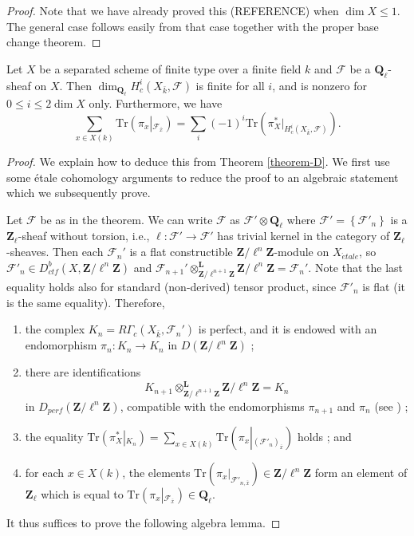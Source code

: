 \begin{proof}
Note that we have already proved this (REFERENCE) when $\dim X \leq 1$. The
general case follows easily from that case together with the proper base change
theorem.
\end{proof}

\begin{theorem}
\label{theorem-C}
Let $X$ be a separated scheme of finite type over a finite field $k$ and
$\mathcal{F}$ be a $\mathbf{Q}_\ell$-sheaf on $X$. Then
$\dim_{\mathbf{Q}_\ell}H_c^i(X_{\bar k}, \mathcal{F})$ is finite for all $i$,
and is nonzero for $0\leq i \leq 2 \dim X$ only. Furthermore, we have
$$
\sum_{x\in X(k)} \text{Tr}\left(\pi_x\left|_{\mathcal{F}_{\bar
x}}\right.\right) = \sum_i (-1)^i\text{Tr}\left(\pi_X^*\big|_{H_c^i(X_{\bar k},
\mathcal{F})}\right).
$$
\end{theorem}

\begin{proof}
We explain how to deduce this from Theorem \ref{theorem-D}.
We first use some \'etale cohomology arguments to reduce the proof
to an algebraic statement which we subsequently prove.

\medskip\noindent
Let $\mathcal{F}$ be as in the theorem. We can write
$\mathcal{F}$ as
$\mathcal{F}'\otimes \mathbf{Q}_\ell$ where $\mathcal{F}' =
\left\{\mathcal{F}'_n\right\}$ is a $\mathbf{Z}_\ell$-sheaf without torsion,
i.e., $\ell : \mathcal{F}'\to \mathcal{F}'$ has trivial kernel in the
category of $\mathbf{Z}_\ell$-sheaves. Then each $\mathcal{F}_n'$ is a flat
constructible $\mathbf{Z}/\ell^n\mathbf{Z}$-module on $X_{\acute{e}tale}$, so
$\mathcal{F}'_n \in D_{ctf}^b(X, \mathbf{Z}/\ell^n\mathbf{Z})$ and
$\mathcal{F}_{n+1}'
\otimes^{\mathbf{L}}_{\mathbf{Z}/\ell^{n+1}\mathbf{Z}}
\mathbf{Z}/\ell^n\mathbf{Z} = \mathcal{F}_n'$.
Note that the last equality holds also
for standard (non-derived) tensor product, since $\mathcal{F}'_n$ is flat
(it is the same equality). Therefore,
\begin{enumerate}
\item
the complex $K_n= R\Gamma_c\left(X_{\bar k}, \mathcal{F}_n'\right)$ is perfect,
and it is endowed with an endomorphism $\pi_n: K_n\to K_n$ in
$D(\mathbf{Z}/\ell^n\mathbf{Z})$ ;
\item
there are identifications
$$
K_{n+1}
\otimes^{\mathbf{L}}_{\mathbf{Z}/\ell^{n+1}\mathbf{Z}}
\mathbf{Z}/\ell^n\mathbf{Z}
=
K_n
$$
in $D_{perf}(\mathbf{Z}/\ell^n\mathbf{Z})$, compatible with the endomorphisms
$\pi_{n+1}$ and $\pi_n$ (see \cite[Rapport 4.12]{SGA4.5}) ;
\item
the equality $\text{Tr}\left(\pi_X^*\left|_{K_n}\right.\right) = \sum_{x\in
X(k)}\text{Tr}\left(\pi_x\left|_{(\mathcal{F}'_n)_{\bar x}}\right.\right)$
holds ; and
\item
for each $x\in X(k)$, the elements
$\text{Tr}\left(\pi_x\big|_{\mathcal{F}'_{n, \bar x}}\right)
\in \mathbf{Z}/\ell^n\mathbf{Z}$
form an element of
$\mathbf{Z}_\ell$ which is equal to
$\text{Tr}\left(
\pi_x\left|_{\mathcal{F}_{\bar x}}\right.
\right) \in \mathbf{Q}_\ell$.
\end{enumerate}
It thus suffices to prove the following algebra lemma.
\end{proof}

